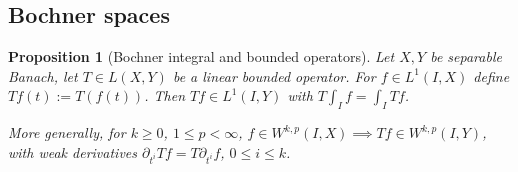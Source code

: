 \documentclass[english,a4paper,10pt,oneside]{scrbook}	%
\theoremstyle{break}
\newtheorem{prop}[equation]{Proposition}
\theoremstyle{remark}
\newcommand{\ds}{\displaystyle}
\newcommand{\cc}{\subset\subset}
\begin{document}
\begin{appendices}
%
%
%
%
%


\section{Bochner spaces}


\begin{prop}[Bochner integral and bounded operators]
\label{lemma:bochner_Hk_map}
Let $X,Y$ be separable Banach, let $T \in L(X,Y)$ be a linear bounded operator. For $f \in L^1(I,X)$ define $Tf (t):= T(f(t))$. Then $Tf \in L^1(I,Y)$ with $T\int_I f = \int_I Tf$.

More generally, for $k\geq 0$, $1\leq p < \infty$, $f \in W^{k,p}(I,X)\implies Tf \in W^{k,p}(I,Y)$, with weak derivatives $\partial_{t^i}Tf = T\partial_{t^i}f$, $0\leq i \leq k$.


\end{prop}
\end{appendices}
\end{document}
